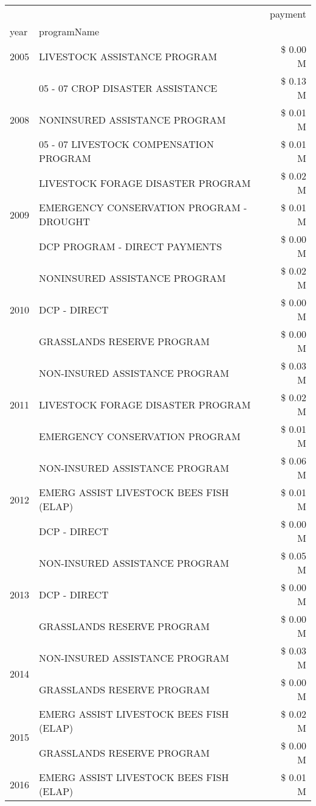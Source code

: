 \begin{tabular}{llr}
\toprule
 &  & payment \\
year & programName &  \\
\midrule
2005 & LIVESTOCK ASSISTANCE PROGRAM & \$ 0.00 M \\
\cline{1-3}
\multirow[t]{3}{*}{2008} & 05 - 07 CROP DISASTER ASSISTANCE & \$ 0.13 M \\
 & NONINSURED ASSISTANCE PROGRAM & \$ 0.01 M \\
 & 05 - 07 LIVESTOCK COMPENSATION PROGRAM & \$ 0.01 M \\
\cline{1-3}
\multirow[t]{3}{*}{2009} & LIVESTOCK FORAGE DISASTER  PROGRAM & \$ 0.02 M \\
 & EMERGENCY CONSERVATION PROGRAM - DROUGHT & \$ 0.01 M \\
 & DCP PROGRAM - DIRECT PAYMENTS & \$ 0.00 M \\
\cline{1-3}
\multirow[t]{3}{*}{2010} & NONINSURED ASSISTANCE PROGRAM & \$ 0.02 M \\
 & DCP - DIRECT & \$ 0.00 M \\
 & GRASSLANDS RESERVE PROGRAM & \$ 0.00 M \\
\cline{1-3}
\multirow[t]{3}{*}{2011} & NON-INSURED ASSISTANCE PROGRAM & \$ 0.03 M \\
 & LIVESTOCK FORAGE DISASTER PROGRAM & \$ 0.02 M \\
 & EMERGENCY CONSERVATION PROGRAM & \$ 0.01 M \\
\cline{1-3}
\multirow[t]{3}{*}{2012} & NON-INSURED ASSISTANCE PROGRAM & \$ 0.06 M \\
 & EMERG ASSIST LIVESTOCK BEES FISH (ELAP) & \$ 0.01 M \\
 & DCP - DIRECT & \$ 0.00 M \\
\cline{1-3}
\multirow[t]{3}{*}{2013} & NON-INSURED ASSISTANCE PROGRAM & \$ 0.05 M \\
 & DCP - DIRECT & \$ 0.00 M \\
 & GRASSLANDS RESERVE PROGRAM & \$ 0.00 M \\
\cline{1-3}
\multirow[t]{2}{*}{2014} & NON-INSURED ASSISTANCE PROGRAM & \$ 0.03 M \\
 & GRASSLANDS RESERVE PROGRAM & \$ 0.00 M \\
\cline{1-3}
\multirow[t]{2}{*}{2015} & EMERG ASSIST LIVESTOCK BEES FISH (ELAP) & \$ 0.02 M \\
 & GRASSLANDS RESERVE PROGRAM & \$ 0.00 M \\
\cline{1-3}
\multirow[t]{2}{*}{2016} & EMERG ASSIST LIVESTOCK BEES FISH (ELAP) & \$ 0.01 M \\

\end{tabular}
